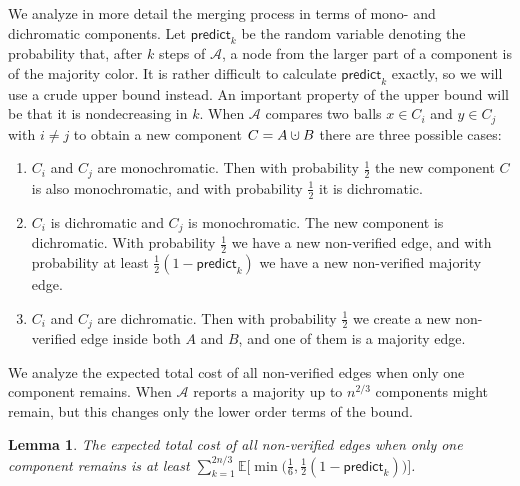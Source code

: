 \documentclass{article}[11pt,a4paper]
\newtheorem{lemma}[definition]{Lemma}
\newcommand{\predict}{\mathsf{predict}}
\newcommand{\E}{\mathbb{E}}
\newcommand{\cupdot}{\mathbin{\mathaccent\cdot\cup}}
\begin{document}
We analyze in more detail the merging process in terms of mono- and dichromatic components.
Let $\predict_k$ be the random variable denoting the probability that, after $k$ steps  of $\mathcal{A}$, a node from the larger
part of a component is of the majority color. It is rather difficult to calculate $\predict_k$
exactly, so we will use a crude upper bound instead. An important property of the
upper bound will be that it is nondecreasing in $k$.
When $\mathcal{A}$ compares two balls $x\in C_i$ and $y\in C_j$ with $i\neq j$ to obtain
a new component $C=A\cupdot B$ there are three possible cases:
\begin{enumerate}
\item $C_i$ and $C_j$ are monochromatic. Then with probability $\frac{1}{2}$ the new
component $C$ is also monochromatic, and with probability $\frac{1}{2}$ it is dichromatic.
\item $C_i$ is dichromatic and $C_j$ is monochromatic. The new component is dichromatic.
With probability $\frac{1}{2}$ we have a new non-verified edge, and with probability at least $\frac{1}{2}(1-\predict_k)$ we have a new non-verified majority edge.
\item $C_i$ and $C_j$ are dichromatic. Then with probability $\frac{1}{2}$ we create a new non-verified
edge inside both $A$ and $B$, and one of them is a majority edge.
\end{enumerate}

We analyze the expected total cost of all non-verified edges when only one component remains.
When $\mathcal{A}$ reports a majority up to $n^{2/3}$ components might remain, but this
changes only the lower order terms of the bound.

\begin{lemma}
\label{lem:nonverified}
The expected total cost of all non-verified edges when only one component remains is at least
$\sum_{k=1}^{2n/3} \E\bigl[\min\bigl(\tfrac{1}{6},\tfrac{1}{2}(1-\predict_k)\bigr)\bigr]$.
\end{lemma}
\end{document}
